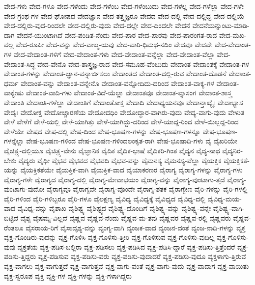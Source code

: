 {ವೇದ-ಗಳು
ವೇದ-ಗಳೂ
ವೇದ-ಗಳೆಂದು
ವೇದ-ಗಳೆಂಬ
ವೇದ-ಗಳೆಂಬುದು
ವೇದ-ಗಳೆಲ್ಲ
ವೇದ-ಗಳೆಲ್ಲಾ
ವೇದ-ಗಳೇ
ವೇದ-ಗ್ರಂಥ-ಗಳ
ವೇದ-ಘೋಷದ
ವೇದಜ್ಞಾನ
ವೇದ-ತತ್ತ್ವಜ್ಞರೂ
ವೇದದ
ವೇದ-ದಲ್ಲಿ
ವೇದ-ದಲ್ಲಿದ್ದ
ವೇದ-ದಲ್ಲಿಯೆ
ವೇದ-ದಲ್ಲಿರು-ವುದ-ರಿಂದಲೇ
ವೇದ-ದಲ್ಲಿರು-ವುದು
ವೇದ-ದಲ್ಲೇ
ವೇದ-ದಿಂದಲೇ
ವೇದನೆ
ವೇದನೆಯನ್ನುಂಟು-ಮಾಡಿ-ದಾಗ
ವೇದನೆ-ಯುಂಟಾಗಿದೆ
ವೇದ-ಪಂಡಿತ-ನೆಂದು
ವೇದ-ಪಾಠ
ವೇದ-ಪಾಠವು
ವೇದ-ಪಾರಂಗತ-ರಾದ
ವೇದ-ಮಖ-ವಲ್ಲ
ವೇದ-ರೂಪೀ
ವೇದ-ವನ್ನು
ವೇದ-ವಾಙ್ಮ-ಯವು
ವೇದ-ವಾರಿ-ಧಿಮಥ-ನದಿಂ
ವೇದವೂ
ವೇದವೇ
ವೇದ-ವೇದಾಂತ-ಗಳ
ವೇದ-ವೇದಾಂತ-ಗಳಿಗೆ
ವೇದ-ವೇದಾಂತ-ಗಳು
ವೇದ-ವೇದಾಂತ-ವನ್ನೆಲ್ಲಾ
ವೇದ-ವೇದಾಂತ-ವೆಲ್ಲಾ
ವೇದ-ವೇದಾಂತ-ಸಿದ್ಧ
ವೇದ-ವೇನೊ
ವೇದ-ಶಾಸ್ತ್ರಜ್ಞ-ರಾದ
ವೇದ-ಸಮೂಹ-ವೆಂಬುದು
ವೇದಾಂತ
ವೇದಾಂತಕ್ಕೆ
ವೇದಾಂತ-ಗಳ
ವೇದಾಂತ-ಗಳನ್ನು
ವೇದಾಂತ-ಜ್ಞಾನ-ವನ್ನಾರ್ಜಿಸಲು
ವೇದಾಂತದ
ವೇದಾಂತ-ದಲ್ಲಿ-ರುವ
ವೇದಾಂತ-ದೊಡನೆ
ವೇದಾಂತ-ಧರ್ಮ
ವೇದಾಂತ-ವನ್ನು
ವೇದಾಂತ-ವನ್ನೇನೊ
ವೇದಾಂತ-ವನ್ನೋದಿದು-ದರಿಂದ
ವೇದಾಂತ-ವಾಕ್ಯ-ಗಳ
ವೇದಾಂತ-ವಾಕ್ಯೇಷು
ವೇದಾಂತ-ವಾದಿ-ಗಳು
ವೇದಾಂತ-ವಿದೆ-ಯೆಲ್ಲಾ
ವೇದಾಂತವೂ
ವೇದಾಂತ-ವ್ಯಾಸಂಗ
ವೇದಾಂತ-ಶಾಸ್ತ್ರ
ವೇದಾಂತಿ
ವೇದಾಂತಿ-ಗಳೆಲ್ಲಾ
ವೇದಾಂತಿಗೆ
ವೇದಾಂತೋಕ್ತ
ವೇದಾದಿ
ವೇದಾಧ್ಯಯನವೂ
ವೇದಾನ್ತಾಖ್ಯೈಃ
ವೇದಾಭ್ಯಾಸ
ವೇದೈಃ
ವೇದೋಕ್ತ
ವೇದೋಚ್ಚಾರಣೆಯ
ವೇದೋದಧಿಂ
ವೇದೋದ್ಧಾರ-ವಾಗಿರು-ವುದು
ವೇದ್ಯ-ವಾಗು-ವುದು
ವೇಳುತ
ವೇಳೆ
ವೇಳೆಗೆ
ವೇಳೆ-ಯಲ್ಲಿ
ವೇಳೆ-ಯಾಗಿತ್ತು
ವೇಳೆ-ಯಾಗಿದ್ದು-ದರಿಂದ
ವೇಳೆ-ಯಾದ್ದ-ರಿಂದ
ವೇಳೆ-ಯಿಲ್ಲದ್ದ-ರಿಂದ
ವೇಳೆಯೇ
ವೇಷದ
ವೇಷ-ದಲ್ಲಿ
ವೇಷ-ದಿಂದ
ವೇಷ-ಭೂಷಣ-ಗಳನ್ನು
ವೇಷ-ಭೂಷಣ-ಗಳನ್ನೂ
ವೇಷ-ಭೂಷಣ-ಗಳನ್ನೆಲ್ಲಾ
ವೇಷ-ಭೂಷಣ-ಗಳಿಂದ
ವೇಷ-ಭೂಷಣ-ಗಳಿಂದಲಂಕೃತ-ರಾಗಿ
ವೇಷ-ಭೂಷಾದಿ-ಗಳು
ವೈ
ವೈಖರಿಯೇ
ವೈಚಿತ್ರ್ಯ-ದಲ್ಲಿಯೂ
ವೈಚಿತ್ರ್ಯ-ವೇನು
ವೈಜ್ಞಾನಿಕ
ವೈದಿಕ
ವೈದಿಕ-ಭಾಷೆ
ವೈದಿಕರಿ-ಗಿಂತ
ವೈದ್ಯನ
ವೈದ್ಯ-ನಾಥ
ವೈದ್ಯನಿರ-ಬೇಕು
ವೈದ್ಯರು
ವೈಧೀ
ವೈಭವ
ವೈಭವದ
ವೈಭವದಿ
ವೈಭವ-ವನ್ನು
ವೈಮನಸ್ಯ
ವೈಮನಸ್ಯ-ವೆಲ್ಲಾ
ವೈಯಕ್ತಿಕ
ವೈಯಕ್ತಿಕತೆ-ಯನ್ನು
ವೈಯಕ್ತಿಕತೆಯೇ
ವೈಯಕ್ತಿಕ-ವಾಗಿ
ವೈಯಕ್ತಿಕ-ವಾದ
ವೈಯಾಕರಣರ
ವೈರಾಗ್ಯ
ವೈರಾಗ್ಯ-ಗಳನ್ನು
ವೈರಾಗ್ಯ-ಗಳು
ವೈರಾಗ್ಯ-ಗಳೇ
ವೈರಾಗ್ಯದ
ವೈರಾಗ್ಯ-ದಲ್ಲಿ
ವೈರಾಗ್ಯ-ಮೇವಾಭಯಂ
ವೈರಾಗ್ಯ-ವನ್ನು
ವೈರಾಗ್ಯ-ವುಂಟಾಗು-ತ್ತದೆ
ವೈರಾಗ್ಯ-ವುಂಟಾಗು-ವುದೋ
ವೈರಾಗ್ಯವೂ
ವೈರಾಗ್ಯವೇ
ವೈರಾಗ್ಯ-ವೊಂದೇ
ವೈರಾಗ್ಯ-ಶತಕ
ವೈರಾಗ್ಯೇಣ
ವೈರಿ-ಗಳನ್ನು
ವೈರಿ-ಗಳಲ್ಲಿ
ವೈರಿ-ಗಳಿಂದ
ವೈರಿ-ಗಳಿಬ್ಬರೂ
ವೈರಿ-ಗಳೂ
ವೈಲಕ್ಷಣ್ಯ
ವೈವಿಧ್ಯ
ವೈವಿಧ್ಯಕ್ಕೆ
ವೈವಿಧ್ಯದ
ವೈವಿಧ್ಯ-ದಲ್ಲಿ
ವೈವಿಧ್ಯ-ಮಯ-ವಾದ
ವೈವಿಧ್ಯ-ವನ್ನು
ವೈಶಾಖ
ವೈಶಿಷ್ಟ್ಯ
ವೈಶಿಷ್ಟ್ಯದ
ವೈಶಿಷ್ಟ್ಯ-ದೊಂದಿಗೆ
ವೈಶಿಷ್ಟ್ಯ-ವನ್ನು
ವೈಶಿಷ್ಟ್ಯ-ವನ್ನೇ
ವೈಶಿಷ್ಟ್ಯ-ವಾಗಿ-ಬಿಟ್ಟಿದೆ
ವೈಶ್ಯ
ವೈಷಮ್ಯ-ವಿಲ್ಲದೆ
ವೈಷ್ಣವ
ವೈಷ್ಣವ-ನೆಂದು
ವೈಷ್ಣವ-ಮ-ತವು
ವೈಷ್ಣವರ
ವೈಷ್ಣವ-ರಲ್ಲಿ
ವೈಷ್ಣವರು
ವೈಷ್ಣವ-ರೆಂತಲೂ
ವೈಸರಾಯ-ರಿಗೆ
ವೈಸಾದೃಶ್ಯ-ವನ್ನು
ವ್ಯಂಗ್ಯ-ವಾಗಿ
ವ್ಯಂಜಕ-ವಾದ
ವ್ಯಂಜನ-ದಂತೆ
ವ್ಯಂಜ-ನಾದಿ-ಗಳನ್ನು
ವ್ಯಕ್ತ
ವ್ಯಕ್ತ-ಗೊಂಡಿರು-ವುದನ್ನು
ವ್ಯಕ್ತ-ಗೊಳಿಸಿ
ವ್ಯಕ್ತ-ಗೊಳಿಸು-ತ್ತೀರಿ
ವ್ಯಕ್ತ-ಗೊಳಿಸುವ
ವ್ಯಕ್ತ-ಗೊಳಿಸು-ವುದಿಲ್ಲ
ವ್ಯಕ್ತ-ಗೊಳಿಸು-ವುವು
ವ್ಯಕ್ತತೆಯ
ವ್ಯಕ್ತ-ಪಡಿಸ-ಬಲ್ಲಿರಾ
ವ್ಯಕ್ತ-ಪಡಿಸಲು
ವ್ಯಕ್ತ-ಪಡಿಸಿದ
ವ್ಯಕ್ತ-ಪಡಿಸಿ-ದ್ದಾರೆ
ವ್ಯಕ್ತ-ಪಡಿಸು-ತ್ತಿತ್ತೆಂದರೆ
ವ್ಯಕ್ತ-ಪಡಿಸು-ತ್ತಿದ್ದರು
ವ್ಯಕ್ತ-ಪಡಿಸುವ
ವ್ಯಕ್ತ-ಪಡಿಸು-ವರು
ವ್ಯಕ್ತ-ಪಡಿಸು-ವುದಾದರೆ
ವ್ಯಕ್ತ-ಪಡಿಸು-ವುದೂ
ವ್ಯಕ್ತಳಾಗು-ತ್ತಿರುವೆ
ವ್ಯಕ್ತ-ವಾಗಲು
ವ್ಯಕ್ತ-ವಾಗುತ್ತದೆ
ವ್ಯಕ್ತ-ವಾಗುತ್ತವೆ
ವ್ಯಕ್ತ-ವಾಗು-ವಂತೆ
ವ್ಯಕ್ತ-ವಾಗು-ವುದು
ವ್ಯಕ್ತ-ವಾದಾಗ
ವ್ಯಕ್ತ-ವಾಯಿತು
ವ್ಯಕ್ತ-ಸ್ವರೂಪ
ವ್ಯಕ್ತಿ
ವ್ಯಕ್ತಿ-ಗಳ
ವ್ಯಕ್ತಿ-ಗಳನ್ನು
ವ್ಯಕ್ತಿ-ಗಳಾಗಿದ್ದರು
}

